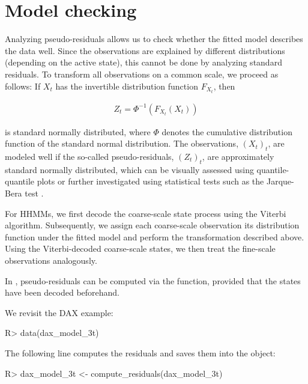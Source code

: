 \documentclass[article]{jss}
\newcommand{\fct}[1]{\code{#1()}}
\begin{document}
\section{Model checking} \label{sec:model_checking} %

Analyzing pseudo-residuals allows us to check whether the fitted model describes the data well. Since the observations are explained by different distributions (depending on the active state), this cannot be done by analyzing standard residuals. To transform all observations on a common scale, we proceed as follows: If $X_t$ has the invertible distribution function $F_{X_t}$, then

\begin{align*}
Z_t=\Phi^{-1}(F_{X_t} (X_t))
\end{align*}

is standard normally distributed, where $\Phi$ denotes the cumulative distribution function of the standard normal distribution. The observations, $(X_t)_t$, are modeled well if the so-called pseudo-residuals, $(Z_t)_t$, are approximately standard normally distributed, which can be visually assessed using quantile-quantile plots or further investigated using statistical tests such as the Jarque-Bera test \cite{zuc16}. 

For HHMMs, we first decode the coarse-scale state process using the Viterbi algorithm. Subsequently, we assign each coarse-scale observation its distribution function under the fitted model and perform the transformation described above. Using the Viterbi-decoded coarse-scale states, we then treat the fine-scale observations analogously.

In , pseudo-residuals can be computed via the \fct{compute\_residuals} function, provided that the states have been decoded beforehand.

We revisit the DAX example:

%
\begin{Schunk}
\begin{Sinput}
R> data(dax_model_3t)
\end{Sinput}
\end{Schunk}
%

The following line computes the residuals and saves them into the  object:

%
\begin{Schunk}
\begin{Sinput}
R> dax_model_3t <- compute_residuals(dax_model_3t)
\end{Sinput}
\end{Schunk}
%
\end{document}
